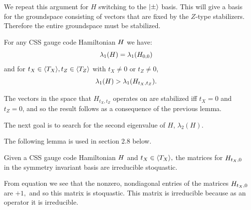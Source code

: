 We repeat this argument for $H$ switching to the
$|{\pm}\rangle$ basis. This will give a basis for the groundspace
consisting of vectors that are fixed by the $Z$-type
stabilizers.
Therefore the entire groundspace must be stabilized.
\tombstone

For any CSS gauge code Hamiltonian $H$
we have:
$$\lambda_1(H) = \lambda_1(H_{0,0})$$
and for $t_X\in\langle T_X \rangle, t_Z\in\langle T_Z \rangle$
with $t_X\ne 0$ or $t_Z\ne 0$,
$$
\lambda_1(H) > \lambda_1(H_{t_X,t_Z}).
$$

\doproof
The vectors in the space that 
$H_{t_X,t_Z}$ operates on 
are stabilized iff $t_X=0$ and $t_Z=0$,
and so the result follows as a 
consequence of the previous lemma.
\tombstone





The next goal is to search for
the second eigenvalue of $H$,
$\lambda_2(H).$

The following lemma is used in section 2.8 below.

Given a 
CSS gauge code Hamiltonian $H$ and
$t_X\in \langle T_X \rangle,$
the matrices for $H_{t_X,0}$ 
in the symmetry invariant basis 
are irreducible stoquastic.

\doproof
From equation  we see that 
the nonzero, nondiagonal entries of the matrices
$H_{t_X,0}$ are $+1,$ and so this matrix is stoquastic.
This matrix is irreducible because as an operator it is
irreducible.
\tombstone

